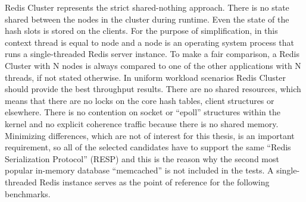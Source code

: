 Redis Cluster represents the strict shared-nothing approach. There is no state shared between the nodes in the cluster during runtime. Even the state of the hash slots is stored on the clients. For the purpose of simplification, in this context thread is equal to node and a node is an operating system process that runs a single-threaded Redis server instance. To make a fair comparison, a Redis Cluster with N nodes is always compared to one of the other applications with N threads, if not stated otherwise. \newline
In uniform workload scenarios Redis Cluster should provide the best throughput results. There are no shared resources, which means that there are no locks on the core hash tables, client structures or elsewhere. There is no contention on socket or “epoll” structures within the kernel and no explicit coherence traffic because there is no shared memory.
Minimizing differences, which are not of interest for this thesis, is an important requirement, so all of the selected candidates have to support the same “Redis Serialization Protocol” (RESP) and this is the reason why the second most popular in-memory database “memcached” is not included in the tests. A single-threaded Redis instance serves as the point of reference for the following benchmarks.

